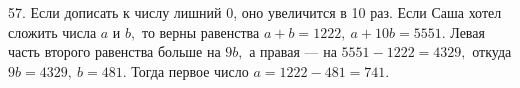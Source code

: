 57. Если дописать к числу лишний 0, оно увеличится в 10 раз. Если Саша хотел сложить числа $a$ и $b,$ то верны равенства $a+b=1222,\ a+10b=5551.$ Левая часть второго равенства больше на $9b,$ а правая --- на $5551-1222=4329,$ откуда $9b=4329,\ b=481.$ Тогда первое число $a=1222-481=741.$\\
